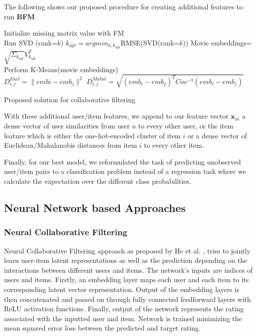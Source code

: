 \documentclass[10pt,conference,compsocconf]{IEEEtran}
\begin{document}
    The following  shows our proposed procedure for creating additional features to run \textbf{BFM}

    \begin{algorithm}
        Initialize missing matrix value with FM\\
         {
        Run SVD (rank=$k$)
        $k_{opt}=argmin_{k, k_{opt}}$RMSE(SVD(rank=$k$))
        }
            Movie embeddings= $\sqrt{\Sigma_{k_{opt}}}V_{k_{opt}}^T$\\
            Perform K-Means(movie embeddings)\\
             {
             {
            $D_{i,j} ^{Eucl} = \|embi - emb_j\|^2$
            }
                }
                 {
                 {
                $D_{i,j} ^{Mahal} = \sqrt{(emb_i-emb_j)^TCov^{-1}(emb_i-emb_j)}$
                }
                    }
                    \caption{Proposed solution for collaborative filtering}
                    \label{alg:algo1}
    \end{algorithm}

    With these additional user/item features, we append to our feature vector $\mathbf{x}_{ui}$ a dense vector of user similarities from user $u$ to every other user, or the item feature which is either the one-hot-encoded cluster of item $i$ or a dense vector of Euclidean/Mahalanobis distances from item $i$ to every other item.

    Finally, for our best model, we reformulated the task of predicting unobserved user/item pairs to a classification problem instead of a regression task where we calculate the expectation over the different class probabilities.

    \subsection{Neural Network based Approaches}

    \subsubsection{Neural Collaborative Filtering}
    Neural Collaborative Filtering approach as proposed by He et al. \cite{DBLP:journals/corr/abs-1708-05031}, tries to
    jointly learn user-item latent representations as well as the prediction depending on the interactions between
    different users and items. The network's inputs are indices of users and items. Firstly, an embedding layer maps
    each user and each item to its corresponding latent vector representation. Output of the embedding layers is then
    concatenated and passed on through fully connected feedforward layers with ReLU activation functions. Finally,
    output of the network represents the rating associated with the inputted user and item. Network is trained minimizing
    the mean squared error loss between the predicted and target rating.
\end{document}
